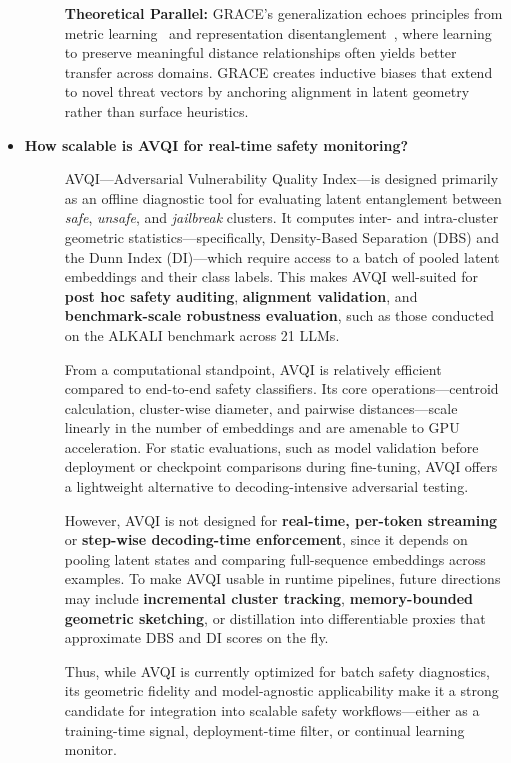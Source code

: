 \begin{itemize}[leftmargin=15pt,nolistsep]
\begin{description}
\medskip
\textbf{Theoretical Parallel:}
GRACE’s generalization echoes principles from metric learning~\citep{khosla2020supervised} and representation disentanglement~\citep{bengio2013representation}, where learning to preserve meaningful distance relationships often yields better transfer across domains. GRACE creates inductive biases that extend to novel threat vectors by anchoring alignment in latent geometry rather than surface heuristics.

\end{description}


\item[\ding{93}] { \selectfont \textbf{How scalable is AVQI for real-time safety monitoring?}}
\begin{description}
\item[] 
AVQI—Adversarial Vulnerability Quality Index—is designed primarily as an offline diagnostic tool for evaluating latent entanglement between \textit{safe}, \textit{unsafe}, and \textit{jailbreak} clusters. It computes inter- and intra-cluster geometric statistics—specifically, Density-Based Separation (DBS) and the Dunn Index (DI)—which require access to a batch of pooled latent embeddings and their class labels. This makes AVQI well-suited for \textbf{post hoc safety auditing}, \textbf{alignment validation}, and \textbf{benchmark-scale robustness evaluation}, such as those conducted on the \textsc{ALKALI} benchmark across 21 LLMs.

From a computational standpoint, AVQI is relatively efficient compared to end-to-end safety classifiers. Its core operations—centroid calculation, cluster-wise diameter, and pairwise distances—scale linearly in the number of embeddings and are amenable to GPU acceleration. For static evaluations, such as model validation before deployment or checkpoint comparisons during fine-tuning, AVQI offers a lightweight alternative to decoding-intensive adversarial testing.

However, AVQI is not designed for \textbf{real-time, per-token streaming} or \textbf{step-wise decoding-time enforcement}, since it depends on pooling latent states and comparing full-sequence embeddings across examples. To make AVQI usable in runtime pipelines, future directions may include \textbf{incremental cluster tracking}, \textbf{memory-bounded geometric sketching}, or distillation into differentiable proxies that approximate DBS and DI scores on the fly.

Thus, while AVQI is currently optimized for batch safety diagnostics, its geometric fidelity and model-agnostic applicability make it a strong candidate for integration into scalable safety workflows—either as a training-time signal, deployment-time filter, or continual learning monitor.
\end{description}



\end{itemize}
